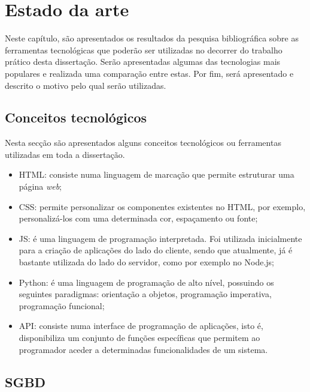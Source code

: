 \chapter{Estado da arte}
\label{state}


Neste capítulo, são apresentados os resultados da pesquisa bibliográfica sobre as ferramentas tecnológicas que poderão ser utilizadas no decorrer do trabalho prático desta dissertação. Serão apresentadas algumas das tecnologias mais populares e realizada uma comparação entre estas. Por fim, será apresentado e descrito o motivo pelo qual serão utilizadas. 
 
\section{Conceitos tecnológicos}

Nesta secção são apresentados alguns conceitos tecnológicos ou ferramentas utilizadas em toda a dissertação. 

\begin{itemize}
	\item \ac{HTML}: consiste numa linguagem de marcação que permite estruturar uma página \textit{web}; 
	
	\item \ac{CSS}: permite personalizar os componentes existentes no \linebreak \ac{HTML}, por exemplo, personalizá-los com uma determinada cor,  espaçamento ou fonte;  
	
	\item \ac{JS}: é uma linguagem de programação interpretada. Foi utilizada inicialmente para a criação de aplicações do lado do cliente, sendo que atualmente, já é bastante utilizada do lado do servidor, como por exemplo no Node.js; 
	
	\item Python: é uma  linguagem de programação de alto nível, possuindo os seguintes paradigmas:  orientação a objetos, programação imperativa, programação funcional;  
	
	
	\item \ac{API}: consiste numa interface de programação de aplicações, isto é, disponibiliza um conjunto de funções específicas que permitem ao programador aceder a determinadas funcionalidades de um sistema.  
	
\end{itemize}

\section{\acl{SGBD}}


